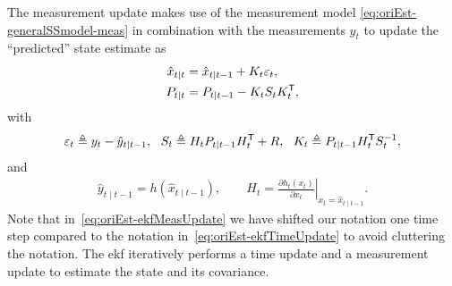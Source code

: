 The measurement update makes use of the measurement model \eqref{eq:oriEst-generalSSmodel-meas} in combination with the measurements $y_t$ to update the ``predicted'' state estimate as 
\begin{subequations}
\begin{align}
\hat{x}_{t \mid t} &= \hat{x}_{t \mid t-1} + K_t \varepsilon_t, \label{eq:ekfMxupdate} \\
P_{t \mid t} &= P_{t \mid t-1} - K_t S_t K_t^{\mathsf{T}}, \label{eq:ekfMPupdate}
\end{align}
\label{eq:oriEst-ekfMeasUpdate}%
\end{subequations}%
with
\begin{align}
\label{eq:oriEst-defEpsKS}
\varepsilon_t \triangleq y_t - \hat{y}_{t \mid t-1}, \, \, \, \, S_t \triangleq H_t P_{t \mid t-1} H_t^{\mathsf{T}} + R, \, \, \, \, K_t \triangleq P_{t \mid t-1} H_t^{\mathsf{T}} S_t^{-1},
\end{align}
and
\begin{align}
\label{eq:oriEst-defYhatH}
\hat{y}_{t \mid t-1} = h(\hat{x}_{t \mid t-1}), \qquad H_t = \left. \tfrac{\partial h_t(x_t)}{\partial x_t} \right|_{x_t=\hat{x}_{t \mid t-1}}.
\end{align}
Note that in~\eqref{eq:oriEst-ekfMeasUpdate} we have shifted our notation one time step compared to the notation in~\eqref{eq:oriEst-ekfTimeUpdate} to avoid cluttering the notation. The \gls{ekf} iteratively performs a time update and a measurement update to estimate the state and its covariance.


